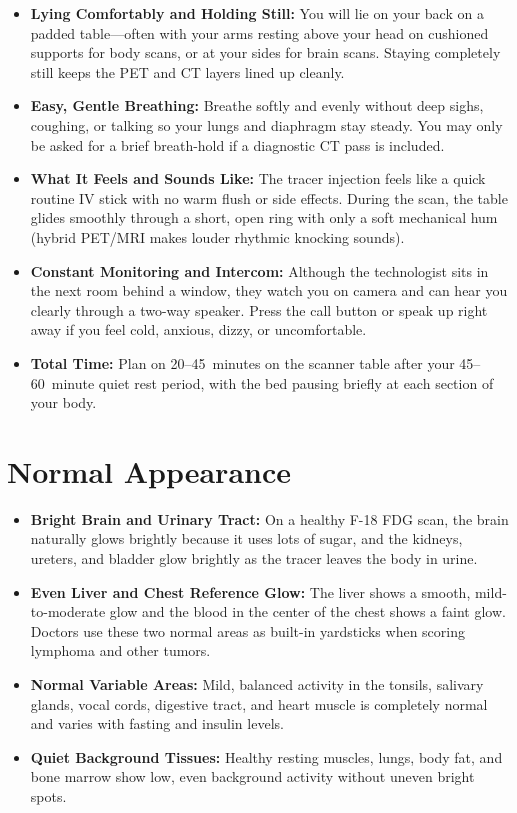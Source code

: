 \begin{itemize}
    \item \textbf{Lying Comfortably and Holding Still:} You will lie on your back on a padded table---often with your arms resting above your head on cushioned supports for body scans, or at your sides for brain scans. Staying completely still keeps the PET and CT layers lined up cleanly.
    \item \textbf{Easy, Gentle Breathing:} Breathe softly and evenly without deep sighs, coughing, or talking so your lungs and diaphragm stay steady. You may only be asked for a brief breath-hold if a diagnostic CT pass is included.
    \item \textbf{What It Feels and Sounds Like:} The tracer injection feels like a quick routine IV stick with no warm flush or side effects. During the scan, the table glides smoothly through a short, open ring with only a soft mechanical hum (hybrid PET/MRI makes louder rhythmic knocking sounds).
    \item \textbf{Constant Monitoring and Intercom:} Although the technologist sits in the next room behind a window, they watch you on camera and can hear you clearly through a two-way speaker. Press the call button or speak up right away if you feel cold, anxious, dizzy, or uncomfortable.
    \item \textbf{Total Time:} Plan on 20--45~minutes on the scanner table after your 45--60~minute quiet rest period, with the bed pausing briefly at each section of your body.
\end{itemize}

\section{Normal Appearance}

\begin{itemize}
    \item \textbf{Bright Brain and Urinary Tract:} On a healthy F-18 FDG scan, the brain naturally glows brightly because it uses lots of sugar, and the kidneys, ureters, and bladder glow brightly as the tracer leaves the body in urine.
    \item \textbf{Even Liver and Chest Reference Glow:} The liver shows a smooth, mild-to-moderate glow and the blood in the center of the chest shows a faint glow. Doctors use these two normal areas as built-in yardsticks when scoring lymphoma and other tumors.
    \item \textbf{Normal Variable Areas:} Mild, balanced activity in the tonsils, salivary glands, vocal cords, digestive tract, and heart muscle is completely normal and varies with fasting and insulin levels.
    \item \textbf{Quiet Background Tissues:} Healthy resting muscles, lungs, body fat, and bone marrow show low, even background activity without uneven bright spots.
\end{itemize}

